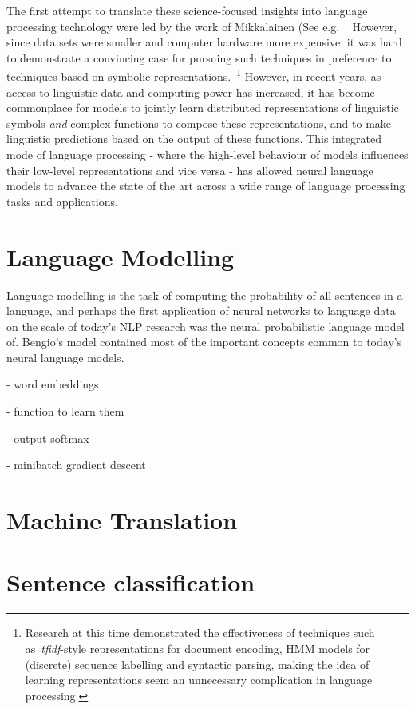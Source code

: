 \documentclass[11pt,letterpaper]{article}
\begin{document}
The first attempt to translate these science-focused insights into language processing technology were led by the work of Mikkalainen (See e.g. ~\cite{elman1990finding,miikkulainen1991natural,miikkulainen1993subsymbolic} 
However, since data sets were smaller and computer hardware more expensive, it was hard to demonstrate a convincing case for pursuing such techniques in preference to techniques based on symbolic representations.~\footnote{Research at this time demonstrated the effectiveness of techniques such as~\emph{tfidf}-style representations for document encoding, HMM models for (discrete) sequence labelling and syntactic parsing, making the idea of learning representations seem an unnecessary complication in language processing.} However, in recent years, as access to linguistic data and computing power has increased, it has become commonplace for models to jointly learn distributed representations of linguistic symbols \emph{and} complex functions to compose these representations, and to make linguistic predictions based on the output of these functions. This integrated mode of language processing - where the high-level behaviour of models influences their low-level representations and vice versa - has allowed neural language models to advance the state of the art across a wide range of language processing tasks and applications.   
     
\section{Language Modelling} Language modelling is the task of computing the probability of all sentences in a language, and perhaps the first application of neural networks to language data on the scale of today's NLP research was the neural probabilistic language model of. Bengio's model contained most of the important concepts common to today's neural language models.   

- word embeddings

- function to learn them

- output softmax

- minibatch gradient descent

\section{Machine Translation}

\section{Sentence classification}
\end{document}
